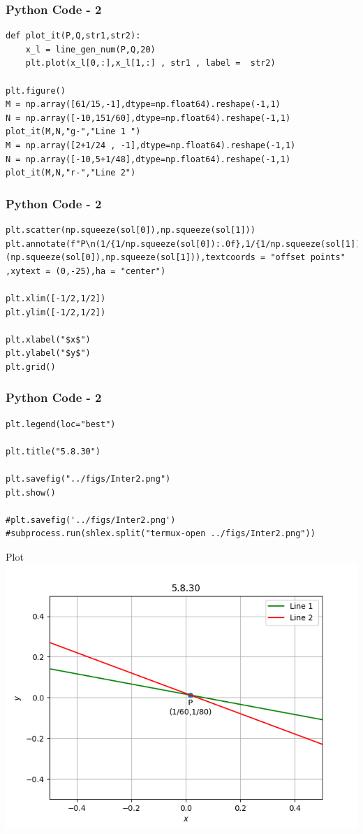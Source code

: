 \documentclass{beamer}
\begin{document}
\begin{frame}[fragile]
    \frametitle{Python Code - 2 }
    \begin{lstlisting}
def plot_it(P,Q,str1,str2):
    x_l = line_gen_num(P,Q,20)
    plt.plot(x_l[0,:],x_l[1,:] , str1 , label =  str2)

plt.figure()
M = np.array([61/15,-1],dtype=np.float64).reshape(-1,1)
N = np.array([-10,151/60],dtype=np.float64).reshape(-1,1)
plot_it(M,N,"g-","Line 1 ")
M = np.array([2+1/24 , -1],dtype=np.float64).reshape(-1,1)
N = np.array([-10,5+1/48],dtype=np.float64).reshape(-1,1)
plot_it(M,N,"r-","Line 2")

\end{lstlisting}
\end{frame}
\begin{frame}[fragile]
    \frametitle{Python Code - 2 }
    \begin{lstlisting}
plt.scatter(np.squeeze(sol[0]),np.squeeze(sol[1]))
plt.annotate(f"P\n(1/{1/np.squeeze(sol[0]):.0f},1/{1/np.squeeze(sol[1]):.0f})",(np.squeeze(sol[0]),np.squeeze(sol[1])),textcoords = "offset points" ,xytext = (0,-25),ha = "center")

plt.xlim([-1/2,1/2])
plt.ylim([-1/2,1/2])

plt.xlabel("$x$")
plt.ylabel("$y$")
plt.grid()

\end{lstlisting}
\end{frame}
\begin{frame}[fragile]
    \frametitle{Python Code - 2 }
    \begin{lstlisting}
plt.legend(loc="best")

plt.title("5.8.30")

plt.savefig("../figs/Inter2.png")
plt.show()

#plt.savefig('../figs/Inter2.png')
#subprocess.run(shlex.split("termux-open ../figs/Inter2.png"))

\end{lstlisting}
\end{frame}
\begin{frame}{Plot}
    \centering
    \includegraphics[width=\columnwidth, height=0.8\textheight, keepaspectratio]{../figs/Inter1.png}   
\end{frame}
\end{document}
